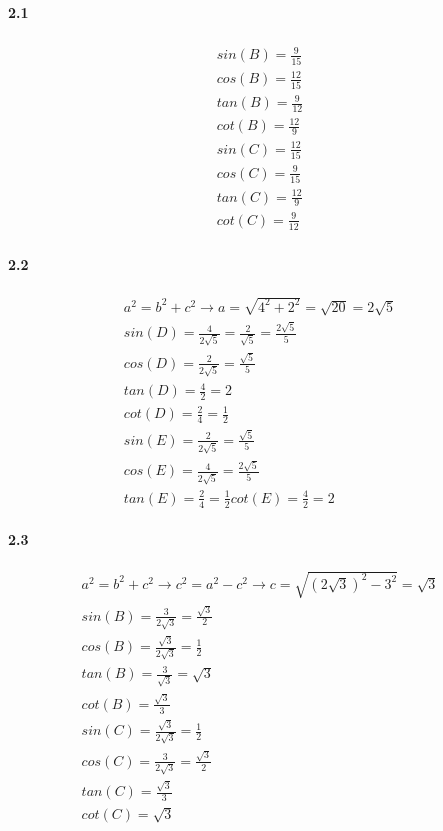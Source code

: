 
 \paragraph{2.1}

 \begin{gather}
  \begin{align}
    sin(B) = \frac{9}{15} \\
    cos(B) = \frac{12}{15} \\
    tan(B) = \frac{9}{12} \\
    cot(B) = \frac{12}{9} \\
    sin(C) = \frac{12}{15} \\
    cos(C) = \frac{9}{15}\\
    tan(C) = \frac{12}{9} \\
    cot(C) = \frac{9}{12}
  \end{align}
 \end{gather}

 \paragraph{2.2}

 \begin{gather}
    a^2 = b^2 + c^2 \rightarrow a = \sqrt{4^2 + 2^2} = \sqrt{20} = 2 \sqrt{5} \\
    sin(D) = \frac{4}{2 \sqrt{5}} = \frac{2}{\sqrt{5}} = \frac{2 \sqrt{5}}{5} \\
    cos(D) = \frac{2}{2 \sqrt{5}} = \frac{\sqrt{5}}{5} \\
    tan(D) = \frac{4}{2} = 2 \\
    cot(D) = \frac{2}{4} = \frac{1}{2} \\ 
    sin(E) = \frac{2}{2 \sqrt{5}} = \frac{\sqrt{5}}{5} \\
    cos(E) = \frac{4}{2 \sqrt{5}} = \frac{2 \sqrt{5}}{5} \\
    tan(E) = \frac{2}{4} = \frac{1}{2}
    cot(E) = \frac{4}{2} = 2
 \end{gather}

 \paragraph{2.3}

 \begin{gather}
   a^2 = b^2 + c^2 \rightarrow c^2 = a^2 - c^2 \rightarrow c = \sqrt{(2 \sqrt{3})^2 - 3^2} = \sqrt{3} \\
   sin(B) = \frac{3}{2 \sqrt{3}} = \frac{\sqrt{3}}{2} \\
   cos(B) = \frac{\sqrt{3}}{2 \sqrt{3}} = \frac{1}{2} \\
   tan(B) = \frac{3}{\sqrt{3}} = \sqrt{3} \\
   cot(B) = \frac{\sqrt{3}}{3} \\
   sin(C) = \frac{\sqrt{3}}{2 \sqrt{3}} = \frac{1}{2} \\
   cos(C) = \frac{3}{2 \sqrt{3}} = \frac{\sqrt{3}}{2} \\
   tan(C) = \frac{\sqrt{3}}{3} \\
   cot(C) = \sqrt{3}
 \end{gather}

